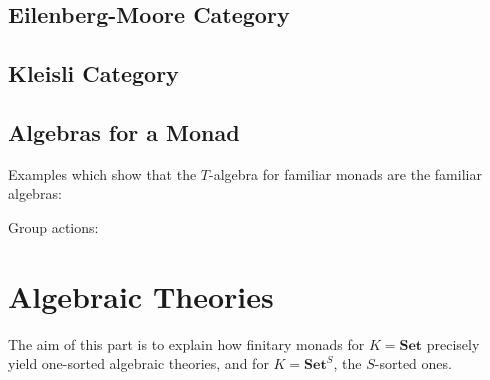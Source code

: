 \documentclass{article}
\begin{document}
\subsection{Eilenberg-Moore Category}


\subsection{Kleisli Category}

\subsection{Algebras for a Monad}
Examples which show that the $T$-algebra for familiar monads are the familiar algebras:
\begin{exam}
Group actions:
\end{exam}

\section{Algebraic Theories}
The aim of this part is to explain
how finitary monads for $K = \mathbf{Set}$ precisely yield one-sorted algebraic theories,
and for $K = \mathbf{Set}^S$, the $S$-sorted ones{\cite{ARV10}}.
\end{document}
